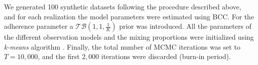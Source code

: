 We generated 100 synthetic datasets following the procedure described above, and for each realization the model parameters were estimated using BCC. For the adherence parameter a $\mathcal{TB}(1, 1, \frac{1}{K})$ prior was introduced. All the parameters of the different observation models and the mixing proportions were initialized using \emph{k-means} algorithm \citep{MacQueen1967}. Finally, the total number of MCMC iterations was set to $T=10,000$, and the first $2,000$ iterations were discarded (\ie burn-in period). 